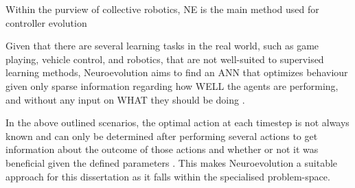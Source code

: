 
Within the purview of collective robotics, NE is the main method used for controller evolution


Given that there are several learning tasks in the real world, such as game playing, vehicle control, and robotics, that are not well-suited to supervised learning methods, Neuroevolution aims to find an ANN that optimizes behaviour given only sparse information regarding how WELL the agents are performing, and without any input on WHAT they should be doing \cite{Miikkulainen2010}. 

In the above outlined scenarios, the optimal action at each timestep is not always known and can only be determined after performing several actions to get information about the outcome of those actions and whether or not it was beneficial given the defined parameters \cite{Miikkulainen2010}.
This makes Neuroevolution a suitable approach for this dissertation as it falls within the specialised problem-space.

